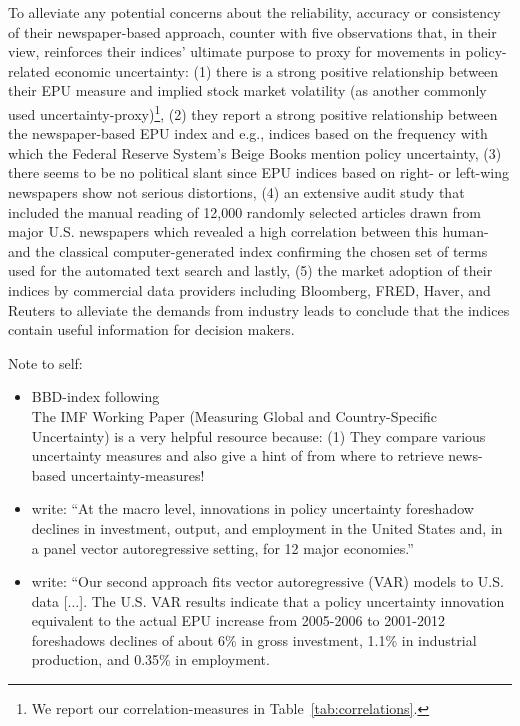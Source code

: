 \documentclass[a4paper,11pt,listof=nochaptergap,oneside,pointednumbers,bibtotoc,bigheadings,liststotoc]{scrbook}
\theoremstyle{mysatz}
\theoremstyle{mydefinition}
\theoremstyle{mybemerkung}
\begin{document}
To alleviate any potential concerns about the reliability, accuracy or consistency of their newspaper-based approach, \citet[p. 1595]{bakeretal:15} counter with five observations that, in their view, reinforces their indices' ultimate purpose to proxy for movements in policy-related economic uncertainty: (1) there is a strong positive relationship between their EPU measure and implied stock market volatility (as another commonly used uncertainty-proxy)\footnote{We report our correlation-measures in Table~\ref{tab:correlations}.}, (2) they report a strong positive relationship between the newspaper-based EPU index and e.g., indices based on the frequency with which the Federal Reserve System's Beige Books mention policy uncertainty, (3) there seems to be no political slant since EPU indices based on right- or left-wing newspapers show not serious distortions, (4) an extensive audit study that included the manual reading of 12,000 randomly selected articles drawn from major U.S. newspapers which revealed a high correlation between this human- and the classical computer-generated index confirming the chosen set of terms used for the automated text search and lastly, (5) the market adoption of their indices by commercial data providers including Bloomberg, FRED, Haver, and Reuters to alleviate the demands from industry leads \citet{bakeretal:15} to conclude that the indices contain useful information for decision makers.



\begingroup
    \fontsize{8pt}{12pt}\selectfont
    Note to self:
\begin{itemize}
	\item  BBD-index following \citet{bakeretal:15}\\
The IMF Working Paper (Measuring Global and Country-Specific Uncertainty) is a very helpful resource because: (1) They compare various uncertainty measures and also give a hint of from where to retrieve news-based uncertainty-measures!
	\item \citet[p. 1593]{bakeretal:15} write: ``At the macro level, innovations in policy uncertainty foreshadow declines in investment, output, and employment in the United States and, in a panel vector autoregressive setting, for 12 major economies.''
	\item \citet[p. 1596]{bakeretal:15} write: ``Our second approach fits vector autoregressive (VAR) models to U.S. data [...]. The U.S. VAR results indicate that a policy uncertainty innovation equivalent to the actual EPU increase from 2005-2006 to 2001-2012 foreshadows declines of about 6\% in gross investment, 1.1\% in industrial production, and 0.35\% in employment.
\end{itemize}
\endgroup
\end{document}
